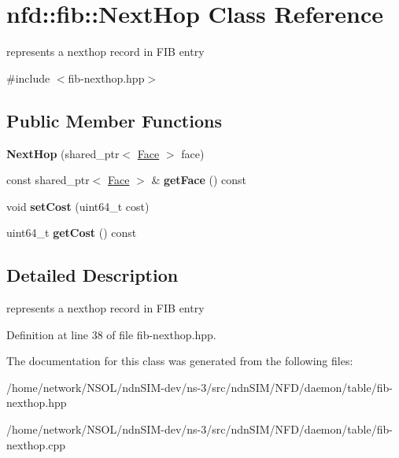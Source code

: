 \hypertarget{classnfd_1_1fib_1_1NextHop}{}\section{nfd\+:\+:fib\+:\+:Next\+Hop Class Reference}
\label{classnfd_1_1fib_1_1NextHop}


represents a nexthop record in F\+IB entry  




{\ttfamily \#include $<$fib-\/nexthop.\+hpp$>$}

\subsection*{Public Member Functions}
\begin{DoxyCompactItemize}
\item 
{\bfseries Next\+Hop} (shared\+\_\+ptr$<$ \hyperlink{classnfd_1_1Face}{Face} $>$ face)\hypertarget{classnfd_1_1fib_1_1NextHop_a55294ec19b0f7bedee7448081ad64f64}{}\label{classnfd_1_1fib_1_1NextHop_a55294ec19b0f7bedee7448081ad64f64}

\item 
const shared\+\_\+ptr$<$ \hyperlink{classnfd_1_1Face}{Face} $>$ \& {\bfseries get\+Face} () const\hypertarget{classnfd_1_1fib_1_1NextHop_aa017bf94a5971b159e1ad495b42cfd2a}{}\label{classnfd_1_1fib_1_1NextHop_aa017bf94a5971b159e1ad495b42cfd2a}

\item 
void {\bfseries set\+Cost} (uint64\+\_\+t cost)\hypertarget{classnfd_1_1fib_1_1NextHop_a777978f52a4b339ab46decb0079094ea}{}\label{classnfd_1_1fib_1_1NextHop_a777978f52a4b339ab46decb0079094ea}

\item 
uint64\+\_\+t {\bfseries get\+Cost} () const\hypertarget{classnfd_1_1fib_1_1NextHop_a33233bd734b5bfcd35f304660640456f}{}\label{classnfd_1_1fib_1_1NextHop_a33233bd734b5bfcd35f304660640456f}

\end{DoxyCompactItemize}


\subsection{Detailed Description}
represents a nexthop record in F\+IB entry 

Definition at line 38 of file fib-\/nexthop.\+hpp.



The documentation for this class was generated from the following files\+:\begin{DoxyCompactItemize}
\item 
/home/network/\+N\+S\+O\+L/ndn\+S\+I\+M-\/dev/ns-\/3/src/ndn\+S\+I\+M/\+N\+F\+D/daemon/table/fib-\/nexthop.\+hpp\item 
/home/network/\+N\+S\+O\+L/ndn\+S\+I\+M-\/dev/ns-\/3/src/ndn\+S\+I\+M/\+N\+F\+D/daemon/table/fib-\/nexthop.\+cpp\end{DoxyCompactItemize}
